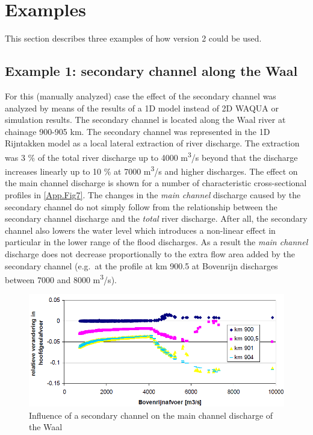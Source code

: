\section{Examples}

This section describes three examples of how \dfastmi version 2 could be used.

\subsection{Example 1: secondary channel along the Waal}

For this (manually analyzed) case the effect of the secondary channel was analyzed by means of the results of a 1D \sobek model instead of 2D WAQUA or \dflowfm simulation results.
The secondary channel is located along the Waal river at chainage 900-905 km.
The secondary channel was represented in the 1D Rijntakken model as a local lateral extraction of river discharge.
The extraction was 3 \% of the total river discharge up to 4000 m\textsuperscript{3}/s beyond that the discharge increases linearly up to 10 \% at 7000 m\textsuperscript{3}/s and higher discharges.
The effect on the main channel discharge is shown for a number of characteristic cross-sectional profiles in \autoref{App.Fig7}.
The changes in the \emph{main channel} discharge caused by the secondary channel do not simply follow from the relationship between the secondary channel discharge and the \emph{total} river discharge.
After all, the secondary channel also lowers the water level which introduces a non-linear effect in particular in the lower range of the flood discharges.
As a result the \emph{main channel} discharge does not decrease proportionally to the extra flow area added by the secondary channel (e.g.~at the profile at km 900.5 at Bovenrijn discharges between 7000 and 8000 m\textsuperscript{3}/s).

\begin{figure}
\includegraphics[width=\columnwidth]{figures/Fig7.png}
\caption{Influence of a secondary channel on the main channel discharge of the Waal}
\label{App.Fig7}
\end{figure}

